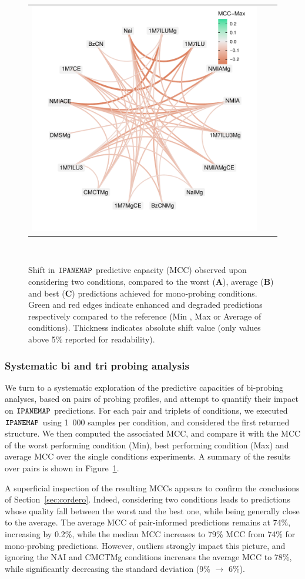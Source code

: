 \documentclass[a4,center,fleqn]{NAR}
\newcommand{\Software}[1]{$\text{\ttfamily #1}$}
\newcommand{\OurTool}{\Software{IPANEMAP}\xspace}
\begin{document}
\begin{figure}
{\begin{tabular}{@{}c@{}c@{}c@{}}
			\includegraphics[width=.65\linewidth,trim=1cm 1cm .8cm .3cm,clip]{graphs/didy/MCC-vs-Max}\\
		\end{tabular}\\}
	\caption{Shift in \OurTool{} predictive capacity (MCC) observed upon considering two conditions, compared to the worst ({\sf\bfseries A}),  average ({\sf\bfseries B}) 
		and best ({\sf\bfseries C}) 
		predictions achieved for mono-probing conditions. Green and red edges indicate enhanced and degraded predictions respectively compared to the reference (Min%
		, Max 
		or Average of conditions). Thickness indicates absolute shift value (only values above 5\% reported for readability).\label{fig:pairwise}}
\end{figure}

\subsubsection{Systematic bi and tri probing analysis}
We turn to a systematic exploration of the predictive capacities of bi-probing analyses, based on pairs of probing profiles, and attempt to quantify their impact on \OurTool predictions. For each pair and triplets of conditions, we executed \OurTool using 1~000 samples per condition, and considered the first returned structure. We then computed the associated MCC, and compare it with the MCC of the worst performing condition (Min), best performing condition (Max) and average MCC over the single conditions experiments. A summary of the results over pairs is shown in Figure~\ref{fig:pairwise}. 

A superficial inspection of the resulting MCCs appears to confirm the conclusions of Section~\ref{sec:cordero}. Indeed, considering two conditions leads to predictions whose quality fall between the worst and the best one, while being generally close to the average. The average MCC of pair-informed predictions remains at 74\%, increasing by 0.2\%, while the median MCC increases to 79\% MCC from 74\% for mono-probing predictions. However, outliers strongly impact this picture, and ignoring the NAI and CMCTMg conditions increases the average MCC to 78\%, while significantly decreasing the standard deviation (9\% $\to$ 6\%).
\end{document}
